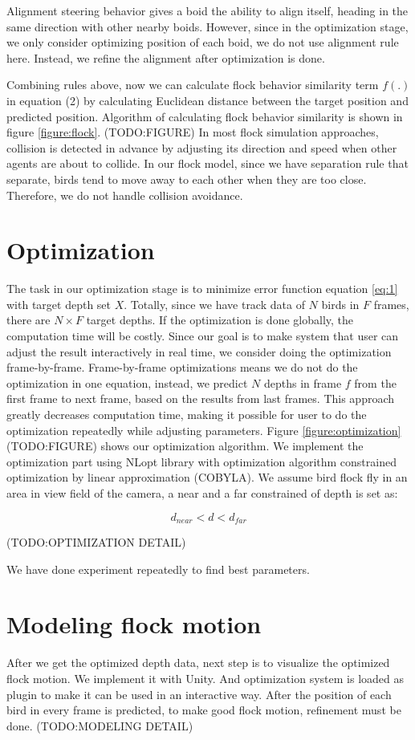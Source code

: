 Alignment steering behavior gives a boid the ability to align itself, heading in the same direction with other nearby boids. However, since in the optimization stage, we only consider optimizing position of each boid, we do not use alignment rule here. Instead, we refine the alignment after optimization is done.


Combining rules above, now we can calculate flock behavior similarity term $f(.)$ in equation (2) by calculating Euclidean distance between the target position and predicted position. Algorithm of calculating flock behavior similarity is shown in figure \ref{figure:flock}. (TODO:FIGURE)
In most flock simulation approaches, collision is detected in advance by adjusting its direction and speed when other agents are about to collide. In our flock model, since we have separation rule that separate, birds tend to move away to each other when they are too close. Therefore, we do not handle collision avoidance.


\section{Optimization}


The task in our optimization stage is to minimize error function equation \ref{eq:1} with target depth set $X$. Totally, since we have track data of $N$ birds in $F$ frames, there are $N{\times}F$ target depths. If the optimization is done globally, the computation time will be costly. Since our goal is to make system that user can adjust the result interactively in real time, we consider doing the optimization frame-by-frame.
Frame-by-frame optimizations means we do not do the optimization in one equation, instead, we predict $N$ depths in frame $f$ from the first frame to next frame, based on the results from last frames. This approach greatly decreases computation time, making it possible for user to do the optimization repeatedly while adjusting parameters. Figure \ref{figure:optimization} (TODO:FIGURE) shows our optimization algorithm.
We implement the optimization part using NLopt library \cite{NLopt} with optimization algorithm constrained optimization by linear approximation (COBYLA)\cite{COBYLA}. We assume bird flock fly in an area in view field of the camera, a near and a far constrained of depth is set as:


\begin{equation}\label{eq:7}
d_{near} < d < d_{far}
\end{equation}


(TODO:OPTIMIZATION DETAIL)


We have done experiment repeatedly to find best parameters.


\section{Modeling flock motion}


After we get the optimized depth data, next step is to visualize the optimized flock motion. We implement it with Unity\cite{Unity}. And optimization system is loaded as plugin to make it can be used in an interactive way.
After the position of each bird in every frame is predicted, to make good flock motion, refinement must be done.
(TODO:MODELING DETAIL)
